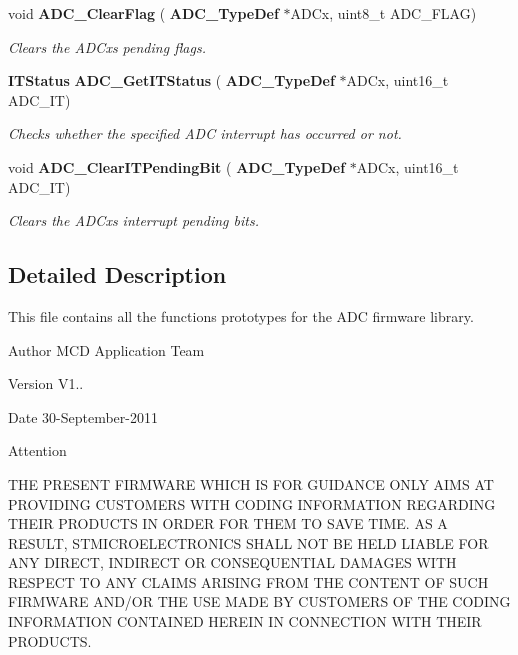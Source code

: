 \begin{DoxyCompactItemize}
void \textbf{ A\+D\+C\+\_\+\+Clear\+Flag} (\textbf{ A\+D\+C\+\_\+\+Type\+Def} $\ast$A\+D\+Cx, uint8\+\_\+t A\+D\+C\+\_\+\+F\+L\+AG)
\begin{DoxyCompactList}\small\item\em Clears the A\+D\+Cx\textquotesingle{}s pending flags. \end{DoxyCompactList}\item 
\textbf{ I\+T\+Status} \textbf{ A\+D\+C\+\_\+\+Get\+I\+T\+Status} (\textbf{ A\+D\+C\+\_\+\+Type\+Def} $\ast$A\+D\+Cx, uint16\+\_\+t A\+D\+C\+\_\+\+IT)
\begin{DoxyCompactList}\small\item\em Checks whether the specified A\+DC interrupt has occurred or not. \end{DoxyCompactList}\item 
void \textbf{ A\+D\+C\+\_\+\+Clear\+I\+T\+Pending\+Bit} (\textbf{ A\+D\+C\+\_\+\+Type\+Def} $\ast$A\+D\+Cx, uint16\+\_\+t A\+D\+C\+\_\+\+IT)
\begin{DoxyCompactList}\small\item\em Clears the A\+D\+Cx\textquotesingle{}s interrupt pending bits. \end{DoxyCompactList}\end{DoxyCompactItemize}


\subsection{Detailed Description}
This file contains all the functions prototypes for the A\+DC firmware library. 

\begin{DoxyAuthor}{Author}
M\+CD Application Team 
\end{DoxyAuthor}
\begin{DoxyVersion}{Version}
V1.. 
\end{DoxyVersion}
\begin{DoxyDate}{Date}
30-\/\+September-\/2011 
\end{DoxyDate}
\begin{DoxyAttention}{Attention}

\end{DoxyAttention}
T\+HE P\+R\+E\+S\+E\+NT F\+I\+R\+M\+W\+A\+RE W\+H\+I\+CH IS F\+OR G\+U\+I\+D\+A\+N\+CE O\+N\+LY A\+I\+MS AT P\+R\+O\+V\+I\+D\+I\+NG C\+U\+S\+T\+O\+M\+E\+RS W\+I\+TH C\+O\+D\+I\+NG I\+N\+F\+O\+R\+M\+A\+T\+I\+ON R\+E\+G\+A\+R\+D\+I\+NG T\+H\+E\+IR P\+R\+O\+D\+U\+C\+TS IN O\+R\+D\+ER F\+OR T\+H\+EM TO S\+A\+VE T\+I\+ME. AS A R\+E\+S\+U\+LT, S\+T\+M\+I\+C\+R\+O\+E\+L\+E\+C\+T\+R\+O\+N\+I\+CS S\+H\+A\+LL N\+OT BE H\+E\+LD L\+I\+A\+B\+LE F\+OR A\+NY D\+I\+R\+E\+CT, I\+N\+D\+I\+R\+E\+CT OR C\+O\+N\+S\+E\+Q\+U\+E\+N\+T\+I\+AL D\+A\+M\+A\+G\+ES W\+I\+TH R\+E\+S\+P\+E\+CT TO A\+NY C\+L\+A\+I\+MS A\+R\+I\+S\+I\+NG F\+R\+OM T\+HE C\+O\+N\+T\+E\+NT OF S\+U\+CH F\+I\+R\+M\+W\+A\+RE A\+N\+D/\+OR T\+HE U\+SE M\+A\+DE BY C\+U\+S\+T\+O\+M\+E\+RS OF T\+HE C\+O\+D\+I\+NG I\+N\+F\+O\+R\+M\+A\+T\+I\+ON C\+O\+N\+T\+A\+I\+N\+ED H\+E\+R\+E\+IN IN C\+O\+N\+N\+E\+C\+T\+I\+ON W\+I\+TH T\+H\+E\+IR P\+R\+O\+D\+U\+C\+TS.

